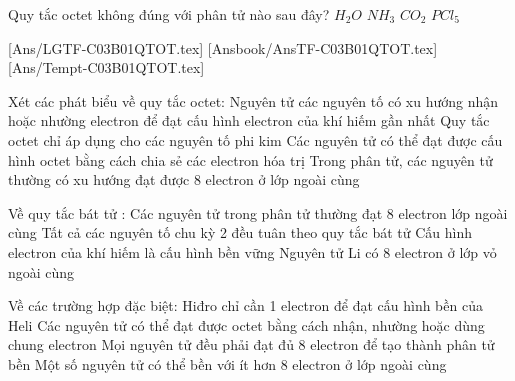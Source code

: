 \begin{ex}
	Quy tắc octet không đúng với phân tử nào sau đây?
	\choice
	{$H_2O$}
	{$NH_3$}
	{$CO_2$}
	{\True $PCl_5$}
	\loigiai{}
\end{ex}
[Ans/LGTF-C03B01QTOT.tex]
[Ansbook/AnsTF-C03B01QTOT.tex]
[Ans/Tempt-C03B01QTOT.tex]
\begin{ex}
	Xét các phát biểu về quy tắc octet:
	\choiceTF
	{\True Nguyên tử các nguyên tố có xu hướng nhận hoặc nhường electron để đạt cấu hình electron của khí hiếm gần nhất}
	{Quy tắc octet chỉ áp dụng cho các nguyên tố phi kim}
	{\True Các nguyên tử có thể đạt được cấu hình octet bằng cách chia sẻ các electron hóa trị}
	{\True Trong phân tử, các nguyên tử thường có xu hướng đạt được 8 electron ở lớp ngoài cùng}
\end{ex}
\begin{ex}
	Về quy tắc bát tử :
	\choiceTF
	{\True Các nguyên tử trong phân tử thường đạt 8 electron lớp ngoài cùng}
	{Tất cả các nguyên tố chu kỳ 2 đều tuân theo quy tắc bát tử}
	{\True Cấu hình electron của khí hiếm là cấu hình bền vững}
	{Nguyên tử Li có 8 electron ở lớp vỏ ngoài cùng}
\end{ex}
\begin{ex}
	Về các trường hợp đặc biệt:
	\choiceTF
	{\True Hiđro chỉ cần 1 electron để đạt cấu hình bền của Heli}
	{\True Các nguyên tử có thể đạt được octet bằng cách nhận, nhường hoặc dùng chung electron}
	{Mọi nguyên tử đều phải đạt đủ 8 electron để tạo thành phân tử bền}
	{\True Một số nguyên tử có thể bền với ít hơn 8 electron ở lớp ngoài cùng}
\end{ex}
